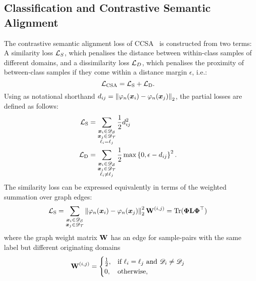 \documentclass[journal]{IEEEtran}
\renewcommand{\vector}[1]{\ensuremath{\bm{\lowercase{#1}}}}
\renewcommand{\matrix}[1]{\ensuremath{\bm{\mathbf{\uppercase{#1}}}}}
\newcommand{\vx}{\vector{x}}
\newcommand{\Domain}{\mathscr{D}} \newcommand{\Task}{\mathscr{T}} \newcommand{\concept}[1]{\ensuremath{\mathcal{\uppercase{#1}}}}
\newcommand{\norm}[1]{\ensuremath{\left\|#1 \right\|}}
\newcommand{\Src}{\mathcal{S}} \newcommand{\Tgt}{\mathcal{T}}
\newcommand{\tr}{\text{Tr}}
\begin{document}
\subsection{Classification and Contrastive Semantic Alignment} \label{sec:dage-ccsa}
The contrastive semantic alignment loss of CCSA~\cite{motiian2017ccsa} is constructed from two terms: A similarity loss $\concept{L}_S$, which penalises the distance between within-class samples of different domains, and a dissimilarity loss $\concept{L}_D$, which penalises the proximity of between-class samples if they come within a distance margin $\epsilon$, i.e.:
\begin{equation}\label{eq:csa-loss-total}
\concept{L}_{\text{CSA}} = \concept{L}_{\text{S}} + \concept{L}_{\text{D}}.
\end{equation}
Using as notational shorthand $d_{ij} =\norm{\varphi_n(\vx_i)-\varphi_n(\vx_j)}_2$, the partial losses are defined as follows:
\begin{align}
    \concept{L}_{\text{S}} 
    &= 
        \sum_{\substack{
            \vx_i \in \Domain_\Src \\
            \vx_j \in \Domain_\Tgt  \\
            \ell_i = \ell_j
        }}
        \frac{1}{2} d_{ij}^2 
    \\
    \concept{L}_{\text{D}}  
    &=
        \sum_{\substack{
            \vx_i \in \Domain_\Src \\
            \vx_j \in \Domain_\Tgt  \\
            \ell_i \neq \ell_j
        }}
        \frac{1}{2} \max 
            \left\{0, 
                \epsilon - d_{ij}
            \right\}^2 .
\end{align}
The similarity loss can be expressed equivalently in terms of the weighted summation over graph edges:
\begin{align}\label{eq:csa-loss-s}
    \concept{L}_{\text{S}} 
    = 
    \sum_{\substack{
        \vx_i \in \Domain_\Src \\
        \vx_j \in \Domain_\Tgt
    }}
    \norm{\varphi_n(\vx_i)-\varphi_n(\vx_j)}_2^2 \matrix{W}^{(i,j)}
    = 
    \tr(\matrix{\Phi} \matrix{L} \matrix{\Phi}^\top)
\end{align}
where the graph weight matrix $\matrix{W}$ has an edge for sample-pairs with the same label but different originating domains
\begin{equation} \label{eq:csa-w}
    \matrix{W}^{(i,j)} = 
        \begin{cases}
            \frac{1}{2}, & \text{if } \ell_i = \ell_j \text{ and } \Domain_i \neq \Domain_j \\
            0, & \text{otherwise,} \\
        \end{cases}
\end{equation}
\end{document}
